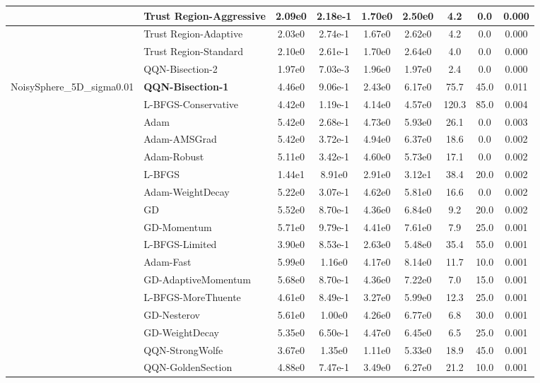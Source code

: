 \documentclass{article}
\begin{document}
\begin{longtable}{|l|l|c|c|c|c|c|c|c|}
\hline
 & Trust Region-Aggressive & 2.09e0 & 2.18e-1 & 1.70e0 & 2.50e0 & 4.2 & 0.0 & 0.000 \\
\hline
 & Trust Region-Adaptive & 2.03e0 & 2.74e-1 & 1.67e0 & 2.62e0 & 4.2 & 0.0 & 0.000 \\
\hline
 & Trust Region-Standard & 2.10e0 & 2.61e-1 & 1.70e0 & 2.64e0 & 4.0 & 0.0 & 0.000 \\
\hline
 & QQN-Bisection-2 & 1.97e0 & 7.03e-3 & 1.96e0 & 1.97e0 & 2.4 & 0.0 & 0.000 \\
NoisySphere\_5D\_sigma0.01 & \textbf{QQN-Bisection-1} & 4.46e0 & 9.06e-1 & 2.43e0 & 6.17e0 & 75.7 & 45.0 & 0.011 \\
\hline
 & L-BFGS-Conservative & 4.42e0 & 1.19e-1 & 4.14e0 & 4.57e0 & 120.3 & 85.0 & 0.004 \\
\hline
 & Adam & 5.42e0 & 2.68e-1 & 4.73e0 & 5.93e0 & 26.1 & 0.0 & 0.003 \\
\hline
 & Adam-AMSGrad & 5.42e0 & 3.72e-1 & 4.94e0 & 6.37e0 & 18.6 & 0.0 & 0.002 \\
\hline
 & Adam-Robust & 5.11e0 & 3.42e-1 & 4.60e0 & 5.73e0 & 17.1 & 0.0 & 0.002 \\
\hline
 & L-BFGS & 1.44e1 & 8.91e0 & 2.91e0 & 3.12e1 & 38.4 & 20.0 & 0.002 \\
\hline
 & Adam-WeightDecay & 5.22e0 & 3.07e-1 & 4.62e0 & 5.81e0 & 16.6 & 0.0 & 0.002 \\
\hline
 & GD & 5.52e0 & 8.70e-1 & 4.36e0 & 6.84e0 & 9.2 & 20.0 & 0.002 \\
\hline
 & GD-Momentum & 5.71e0 & 9.79e-1 & 4.41e0 & 7.61e0 & 7.9 & 25.0 & 0.001 \\
\hline
 & L-BFGS-Limited & 3.90e0 & 8.53e-1 & 2.63e0 & 5.48e0 & 35.4 & 55.0 & 0.001 \\
\hline
 & Adam-Fast & 5.99e0 & 1.16e0 & 4.17e0 & 8.14e0 & 11.7 & 10.0 & 0.001 \\
\hline
 & GD-AdaptiveMomentum & 5.68e0 & 8.70e-1 & 4.36e0 & 7.22e0 & 7.0 & 15.0 & 0.001 \\
\hline
 & L-BFGS-MoreThuente & 4.61e0 & 8.49e-1 & 3.27e0 & 5.99e0 & 12.3 & 25.0 & 0.001 \\
\hline
 & GD-Nesterov & 5.61e0 & 1.00e0 & 4.26e0 & 6.77e0 & 6.8 & 30.0 & 0.001 \\
\hline
 & GD-WeightDecay & 5.35e0 & 6.50e-1 & 4.47e0 & 6.45e0 & 6.5 & 25.0 & 0.001 \\
\hline
 & QQN-StrongWolfe & 3.67e0 & 1.35e0 & 1.11e0 & 5.33e0 & 18.9 & 45.0 & 0.001 \\
\hline
 & QQN-GoldenSection & 4.88e0 & 7.47e-1 & 3.49e0 & 6.27e0 & 21.2 & 10.0 & 0.001 \\

\end{longtable}
\end{document}
